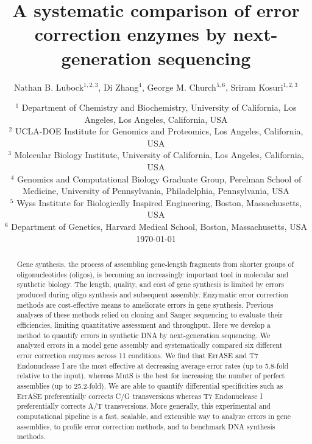\documentclass[letterpaper,12pt]{article}
\begin{document}
\title{A systematic comparison of error correction enzymes by next-generation sequencing}

\author{Nathan B. Lubock$^{1,2,3}$\footnotemark[2], Di Zhang$^{4}$\footnotemark[2], George M. Church$^{5,6}$,
Sriram Kosuri$^{1,2,3}$\footnotemark[1]}


\date{%
	\footnotesize%
    $^1$ Department of Chemistry and Biochemistry, University of California, Los Angeles, Los Angeles, California, USA\\%
    $^2$ UCLA-DOE Institute for Genomics and Proteomics, Los Angeles, California, USA \\%
    $^3$ Molecular Biology Institute, University of California, Los Angeles, California, USA \\%
    $^4$ Genomics and Computational Biology Graduate Group, Perelman School of Medicine, University of Pennsylvania, Philadelphia, Pennsylvania, USA\\
    $^5$ Wyss Institute for Biologically Inspired Engineering, Boston, Massachusetts, USA\\%
    $^6$ Department of Genetics, Harvard Medical School, Boston, Massachusetts, USA \\[2ex]%
    \small\today%
}
\maketitle

\begin{abstract}
Gene synthesis, the process of assembling gene-length fragments from shorter groups of oligonucleotides (oligos), is becoming an increasingly important tool in molecular and synthetic biology. The length, quality, and cost of gene synthesis is limited by errors produced during oligo synthesis and subsequent assembly. Enzymatic error correction methods are cost-effective means to ameliorate errors in gene synthesis. Previous analyses of these methods relied on cloning and Sanger sequencing to evaluate their efficiencies, limiting quantitative assessment and throughput. Here we develop a method to quantify errors in synthetic DNA by next-generation sequencing. We analyzed errors in a model gene assembly and systematically compared six different error correction enzymes across 11 conditions. We find that ErrASE and T7 Endonuclease I are the most effective at decreasing average error rates (up to 5.8-fold relative to the input), whereas MutS is the best for increasing the number of perfect assemblies (up to 25.2-fold). We are able to quantify differential specificities such as ErrASE preferentially corrects C/G transversions whereas T7 Endonuclease I preferentially corrects A/T transversions. More generally, this experimental and computational pipeline is a fast, scalable, and extensible way to analyze errors in gene assemblies, to profile error correction methods, and to benchmark DNA synthesis methods.
\end{abstract}
\end{document}
